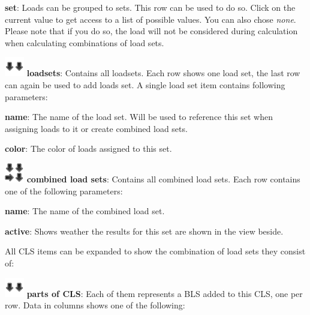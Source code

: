 \documentclass[a4paper,11pt]{report}
\begin{document}
\begin{trivlist}
\begin{trivlist}
		\item[] \textbf{set}: Loads can be grouped to sets. This row can be used to do so. Click on the current value to get access to a list of possible values. You can also chose \textit{none}. Please note that if you do so, the load will not be considered during calculation when calculating combinations of load sets.
		\end{trivlist}
	\item[] \includegraphics[scale = 0.5]{../../icons/bls.png} \textbf{loadsets}: Contains all loadsets. Each row shows one load set, the last row can again be used to add loads set. A single load set item contains following parameters:
	\begin{trivlist}
		\leftskip=1cm
		\item[]\textbf{name}: The name of the load set. Will be used to reference this set when assigning loads to it or create combined load sets.
		\item[]\textbf{color}: The color of loads assigned to this set.
	\end{trivlist}
	\item[] \includegraphics[scale = 0.5]{../../icons/cls.png} \textbf{combined load sets}: Contains all combined load sets. Each row contains one of the following parameters:
	\begin{trivlist}
		\leftskip=1cm
		\item[]\textbf{name}: The name of the combined load set. 
		\item[]\textbf{active}: Shows weather the results for this set are shown in the view beside.
	\end{trivlist}
	All CLS items can be expanded to show the combination of load sets they consist of:
	\begin{trivlist}
		\leftskip=1cm
		\item[] \includegraphics[scale = 0.5]{../../icons/bls.png} \textbf{parts of CLS}: Each of them represents a BLS added to this CLS, one per row. Data in columns shows one of the following:
		\begin{trivlist}
			\leftskip=2cm

\end{trivlist}
\end{trivlist}
\end{trivlist}
\end{document}
